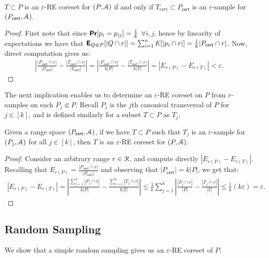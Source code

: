 \documentclass[11pt]{myclass}
\newcommand{\eps}{\varepsilon}
\newcommand{\Eu}[1]{\ensuremath{\EuScript{#1}}}
\newcommand{\E}{\textbf{\textsf{E}}}
\renewcommand{\Pr}{\textbf{\textsf{Pr}}}
\newcommand{\cert}{\textsf{cert}}
\newcommand{\RE}{\textsf{RE}\xspace}
\begin{document}
\begin{lemma}\label{lem:certtocomp}
 $T \subset P$ is an $\eps$-\RE coreset for $(P,\Eu{A})$ if and only if $T_{\text{cert}} \subset P_\cert$ is an $\eps$-sample for $(P_\cert,\Eu{A})$.  
\end{lemma}
\begin{proof}
First note that since $\Pr[p_i = p_{ij}] = \frac{1}{k}$ $\forall i,j$, hence by linearity of expectations we have that 
$\E_{Q \Subset P} [|Q \cap r|] = \sum_{i=1}^n E[|p_i \cap r|] =\frac{1}{k} |P_\cert \cap r |$. 
Now, direct computation gives us:
\begin{align*}
\left| \frac{|P_\cert \cap r|}{|P_\cert|} - \frac{|T_\cert \cap r|}{|T_\cert|} \right|
= \left| \frac{|P_\cert \cap r|}{k |P|} - \frac{|T_\cert \cap r|}{k |T|} \right| 
= \left|  E_{r(P)} - E_{r(T)} \right|  < \eps. 
\end{align*}
\end{proof}

The next implication enables us to determine an $\eps$-\RE coreset on $P$ from $\eps$-samples on each $P_j \Subset P$.  Recall $P_j$ is the $j$th canonical transversal of $P$ for $j \in [k]$, and is defined similarly for a subset $T \subset P$ as $T_j$.
 

\begin{lemma}\label{lem:eachcomp}
Given a range space $(P_\cert,\Eu{A})$, if we have $T \subset P$ such that $T_j$ is an $\eps$-sample for $(P_j, \Eu{A})$ for all $j \in [k]$, then $T$ is an $\eps$-\RE coreset for $(P, \Eu{A})$. 
\end{lemma}

\begin{proof} Consider an arbitrary range $r \in \Eu{R}$, and compute directly  
 $\left| E_{r(P)} - E_{r(T)}  \right| $.
Recalling that $E_{r(P)} = \frac{|P_\cert \cap r|}{|P_\cert|}$
and observing that $|P_\cert| = k |P|$, we get that:
\begin{align*}
\left| E_{r(P)} - E_{r(T)} \right| 
= 
\left| \frac{\sum_{j=1}^k |P_j \cap r|}{k |P|} -  \frac{\sum_{j=1}^k |T_j \cap r|}{k |T|} \right|  
\leq 
\frac{1}{k}  \sum_{j=1}^k \left| \frac{|P_j \cap r|}{|P|} - \frac{|T_j \cap r|}{|T|} \right| 
\leq 
\frac{1}{k} (k \eps) 
= \eps. 
\end{align*}
\end{proof}


\subsection{Random Sampling}
 We show that a simple random sampling gives us an $\eps$-\RE coreset of $P$.
  
\end{document}
